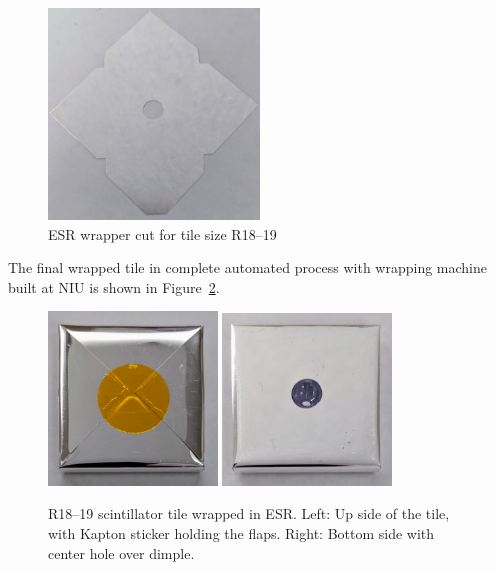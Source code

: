 \begin{figure}[!ht]
  \centering
  \includegraphics[width=0.5\textwidth]{figures/hgcal/esr_wrapper.jpg}
  \caption[ESR wrapper cut for tile size R18--19]
  {ESR wrapper cut for tile size R18--19}%
  \label{fig:hgcal-esr-wrapper}
\end{figure}

The final wrapped tile in complete automated process
with wrapping machine built at NIU
is shown in Figure~\ref{fig:hgcal-scintillator-tile-wrapped}.

\begin{figure}[!ht]
  \centering
  \includegraphics[width=0.4\textwidth]{figures/hgcal/wrapped_tile_up.jpg}
  \includegraphics[width=0.4\textwidth]{figures/hgcal/wrapped_tile_down.jpg}
  \caption[R18--19 scintillator tile wrapped in ESR]
  {R18--19 scintillator tile wrapped in ESR\@. Left: Up side of the tile, with
    Kapton sticker holding the flaps. Right: Bottom side with center hole
    over dimple.}%
  \label{fig:hgcal-scintillator-tile-wrapped}
\end{figure}

